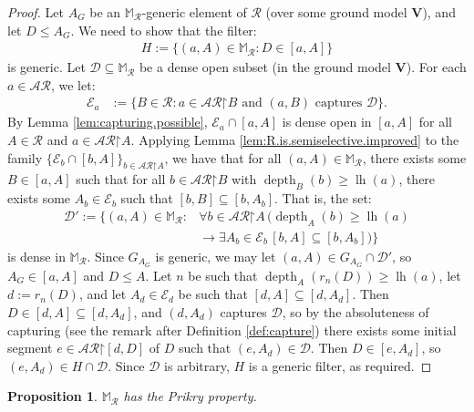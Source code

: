 \documentclass[11pt,reqno]{amsart}
\theoremstyle{plain}
\numberwithin{equation}{section}
\newtheorem{proposition}[theorem]{Proposition}
\theoremstyle{definition}
\newcommand{\func}{\operatorname}
\newcommand{\cal}{\mathcal}
\renewcommand{\bf}{\mathbf}
\newcommand{\restrictedto}{\mathord{\upharpoonright}}
\newcommand{\V}{\bf{V}}
\newcommand{\lh}{\func{lh}}
\newcommand{\depth}{\func{depth}}
\newcommand{\D}{\cal{D}}
\newcommand{\E}{\cal{E}}
\begin{document}
\begin{proof}
    Let $A_G$ be an $\mathbb{M}_\cal{R}$-generic element of $\cal{R}$ (over some ground model $\V$), and let $D \leq A_G$. We need to show that the filter:
    \begin{align*}
        H := \{(a,A) \in \mathbb{M}_\cal{R} : D \in [a,A]\}
    \end{align*}
    is generic. Let $\D \subseteq \mathbb{M}_\cal{R}$ be a dense open subset (in the ground model $\V$). For each $a \in \cal{AR}$, we let:
    \begin{align*}
        \E_a &:= \{B \in \cal{R} : a \in \cal{AR}\restrictedto B \text{ and $(a,B)$ captures $\D$}\}.
    \end{align*}
    By Lemma \ref{lem:capturing.possible}, $\E_a \cap [a,A]$ is dense open in $[a,A]$ for all $A \in \cal{R}$ and $a \in \cal{AR}\restrictedto A$. Applying Lemma \ref{lem:R.is.semiselective.improved} to the family $\{\E_b \cap [b,A]\}_{b \in \cal{AR}\restrictedto A}$, we have that for all $(a,A) \in \mathbb{M}_\cal{R}$, there exists some $B \in [a,A]$ such that for all $b \in \cal{AR}\restrictedto B$ with $\depth_B(b) \geq \lh(a)$, there exists some $A_b \in \E_b$ such that $[b,B] \subseteq [b,A_b]$. That is, the set:
    \begin{align*}
        \D' := \{(a,A) \in \mathbb{M}_\cal{R} : {}&\forall b \in \cal{AR}\restrictedto A \, (\depth_A(b) \geq \lh(a) \\
        &\to \exists A_b \in \E_b \, [b,A] \subseteq [b,A_b])\}
    \end{align*}
    is dense in $\mathbb{M}_\cal{R}$. Since $G_{A_G}$ is generic, we may let $(a,A) \in G_{A_G} \cap \D'$, so $A_G \in [a,A]$ and $D \leq A$. Let $n$ be such that $\depth_A(r_n(D)) \geq \lh(a)$, let $d := r_n(D)$, and let $A_d \in \E_d$ be such that $[d,A] \subseteq [d,A_d]$. Then $D \in [d,A] \subseteq [d,A_d]$, and $(d,A_d)$ captures $\D$, so by the absoluteness of capturing (see the remark after Definition \ref{def:capture}) there exists some initial segment $e \in \cal{AR}\restrictedto[d,D]$ of $D$ such that $(e,A_d) \in \D$. Then $D \in [e,A_d]$, so $(e,A_d) \in H \cap \D$. Since $\D$ is arbitrary, $H$ is a generic filter, as required.
\end{proof}

\begin{proposition}
\label{prop:semiselective.implies.Prikry}
    $\mathbb{M}_\cal{R}$ has the Prikry property.
\end{proposition}
\end{document}
